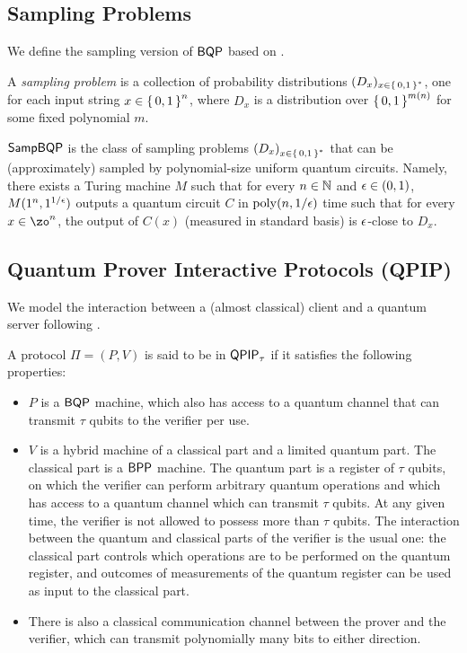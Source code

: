 \subsection{Sampling Problems}

We define the sampling version of $\operatorname{\mathsf{BQP}}$ based on \cite{aaronson_2013}.

\begin{definition} 
	\label{dfn:sampling-problem}
	A \emph{sampling problem} is a collection of probability distributions $(D_x)_{x\in\set{0, 1}^*}$, one for each input string $x\in\set{0,1}^n$, where $D_x$ is a distribution over $\set{0,1}^{m(n)}$ for some fixed polynomial $m$.
\end{definition}

\begin{definition} [$\SampBQP$]
	$\SampBQP$ is the class of sampling problems $\left(D_x\right)_{x\in\set{0, 1}^*}$ that can be (approximately) sampled by polynomial-size uniform quantum circuits. Namely, there exists a Turing machine $M$ such that for every $n \in \mathbb{N}$ and $\epsilon \in (0,1)$, $M(1^n, 1^{1/\epsilon})$ outputs a quantum circuit $C$ in $\operatorname*{\operatorname{poly}}(n, 1/\epsilon)$ time such that for every $x \in \zo^n$, the output of $C(x)$ (measured in standard basis) is $\epsilon$-close to $D_x$.
\end{definition}

\subsection{Quantum Prover Interactive Protocols (QPIP)}

We model the interaction between a (almost classical) client and a quantum server following \cite{FOCS:Mahadev18a}.

\begin{definition}
	A protocol $\Pi=(P, V)$ is said to be in $\operatorname{\mathsf{QPIP}}_\tau$ if it satisfies the following properties:
	\begin{itemize}
		\item $P$ is a $\operatorname{\mathsf{BQP}}$ machine, which also has access to a quantum channel that can transmit $\tau$ qubits to the verifier per use.
		\item $V$ is a hybrid machine of a classical part and a limited quantum part. The classical part is a $\operatorname{\mathsf{BPP}}$ machine. The quantum part is a register of $\tau$ qubits, on which the verifier can perform arbitrary quantum operations and which has access to a quantum channel which can transmit $\tau$ qubits. At any given time, the verifier is not allowed to possess more than $\tau$ qubits. The interaction between the quantum and classical parts of the verifier is the usual one: the classical part controls which operations are to be performed on the quantum register, and outcomes of measurements of the quantum register can be used as input to the classical part.
		\item There is also a classical communication channel between the prover and the verifier, which can transmit polynomially many bits to either direction.
	\end{itemize}
\end{definition}

